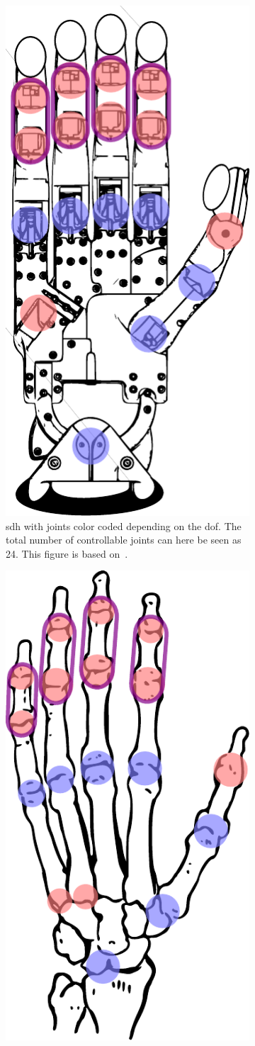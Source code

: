 \begin{figure}[h]
	\centering
	\begin{subfigure}[b]{0.48\textwidth}
		\centering
		\includegraphics[height=\textwidth]{chapters/system-setup/fig/robot-hand-skeleton-coupled.pdf}
		\caption{\gls{sdh} with joints color coded depending on the \gls{dof}. The total number of controllable joints can here be seen as \num{24}. This figure is based on~\cite{svg-robot-hand}.}
		\label{fig:robot-hand-skeleton}
	\end{subfigure}
	\hfill
	\begin{subfigure}[b]{0.48\textwidth}
		\centering
		\includegraphics[height=\textwidth]{chapters/system-setup/fig/human-skeleton-hand-coupled.pdf}

\end{subfigure}
\end{figure}
